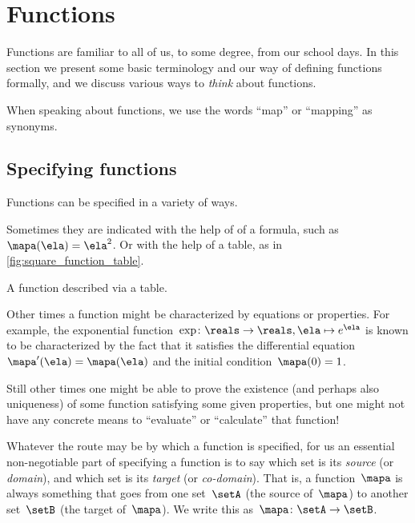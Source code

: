 
\section{Functions}
\label{sec:functions}

Functions are familiar to all of us, to some degree, from our school days.
In this section we present some basic terminology and our way of defining functions formally, and we discuss various ways to \emph{think} about functions.

When speaking about functions, we use the words ``map'' or ``mapping'' as synonyms.

\subsection{Specifying functions}
\label{sec:domain-codomain}

Functions can be specified in a variety of ways.

Sometimes they are indicated with the help of of a formula, such as~$\mapa(\ela)=\ela^2$.
Or with the help of a table, as in \cref{fig:square_function_table}.

\begin{marginfigure}
    \centering
    \caption{A function described via a table.}
    \label{fig:square_function_table}
\end{marginfigure}

Other times a function might be characterized by equations or properties.
For example, the exponential function~$\exp \colon \reals \to \reals, \ela \mapsto e^\ela$ is known to be characterized by the fact that it satisfies the differential equation~$\mapa'(\ela) = \mapa(\ela)$ and the initial condition~$\mapa(0) =1$.

Still other times one might be able to prove the existence (and perhaps also uniqueness) of some function satisfying some given properties, but one might not have any concrete means to ``evaluate'' or ``calculate'' that function!

Whatever the route may be by which a function is specified, for us an essential non-negotiable part of specifying a function is to say which set is its \emph{source} (or \emph{domain}), and which set is its \emph{target} (or \emph{co-domain}).
That is, a function~$\mapa$ is always something that goes from one set~$\setA$ (the source of~$\mapa$) to another set~$\setB$ (the target of~$\mapa$).
We write this as~$\mapa\colon \setA \to \setB$.

